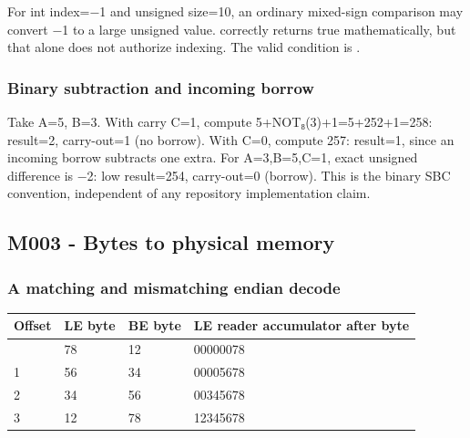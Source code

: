 For int index=−1 and unsigned size=10, an ordinary mixed-sign comparison may convert −1 to a large unsigned value.  correctly returns true mathematically, but that alone does not authorize indexing. The valid condition is .

\subsubsection{Binary subtraction and incoming borrow}\label{appendix-92ff77d4dfdc-binary-subtraction-and-incoming-borrow}

\hypertarget{appendix-92ff77d4dfdc-binary-subtraction-and-incoming-borrow}{}

Take A=5, B=3. With carry C=1, compute 5+NOT₈(3)+1=5+252+1=258: result=2, carry-out=1 (no borrow). With C=0, compute 257: result=1, since an incoming borrow subtracts one extra. For A=3,B=5,C=1, exact unsigned difference is −2: low result=254, carry-out=0 (borrow). This is the binary SBC convention, independent of any repository implementation claim.

\subsection{M003 - Bytes to physical memory}\label{appendix-92ff77d4dfdc-m003---bytes-to-physical-memory}

\hypertarget{appendix-92ff77d4dfdc-m003---bytes-to-physical-memory}{}

\subsubsection{A matching and mismatching endian decode}\label{appendix-92ff77d4dfdc-a-matching-and-mismatching-endian-decode}

\hypertarget{appendix-92ff77d4dfdc-a-matching-and-mismatching-endian-decode}{}

{\def\LTcaptype{none} %
\begin{longtable}[]{@{}llll@{}}
\toprule\noalign{}
Offset & LE byte & BE byte & LE reader accumulator after byte \\
\midrule\noalign{}
\endhead
\bottomrule\noalign{}
\endlastfoot
0 & 78 & 12 & 00000078 \\
1 & 56 & 34 & 00005678 \\
2 & 34 & 56 & 00345678 \\
3 & 12 & 78 & 12345678 \\
\end{longtable}
}

